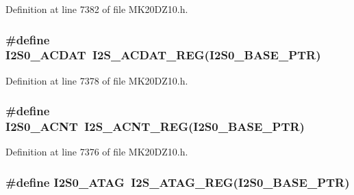 Definition at line 7382 of file M\+K20\+D\+Z10.\+h.

\subsubsection[{\texorpdfstring{I2\+S0\+\_\+\+A\+C\+D\+AT}{I2S0_ACDAT}}]{\setlength{\rightskip}{0pt plus 5cm}\#define I2\+S0\+\_\+\+A\+C\+D\+AT~{\bf I2\+S\+\_\+\+A\+C\+D\+A\+T\+\_\+\+R\+EG}({\bf I2\+S0\+\_\+\+B\+A\+S\+E\+\_\+\+P\+TR})}\hypertarget{group___i2_s___register___accessor___macros_gad7e6ee592876890d170df9885a3d7be5}{}\label{group___i2_s___register___accessor___macros_gad7e6ee592876890d170df9885a3d7be5}


Definition at line 7378 of file M\+K20\+D\+Z10.\+h.

\subsubsection[{\texorpdfstring{I2\+S0\+\_\+\+A\+C\+NT}{I2S0_ACNT}}]{\setlength{\rightskip}{0pt plus 5cm}\#define I2\+S0\+\_\+\+A\+C\+NT~{\bf I2\+S\+\_\+\+A\+C\+N\+T\+\_\+\+R\+EG}({\bf I2\+S0\+\_\+\+B\+A\+S\+E\+\_\+\+P\+TR})}\hypertarget{group___i2_s___register___accessor___macros_ga23dc1fc0ee94812107e735f64500bef6}{}\label{group___i2_s___register___accessor___macros_ga23dc1fc0ee94812107e735f64500bef6}


Definition at line 7376 of file M\+K20\+D\+Z10.\+h.

\subsubsection[{\texorpdfstring{I2\+S0\+\_\+\+A\+T\+AG}{I2S0_ATAG}}]{\setlength{\rightskip}{0pt plus 5cm}\#define I2\+S0\+\_\+\+A\+T\+AG~{\bf I2\+S\+\_\+\+A\+T\+A\+G\+\_\+\+R\+EG}({\bf I2\+S0\+\_\+\+B\+A\+S\+E\+\_\+\+P\+TR})}\hypertarget{group___i2_s___register___accessor___macros_gab7da90fd3a5b742a6f278eba46029095}{}\label{group___i2_s___register___accessor___macros_gab7da90fd3a5b742a6f278eba46029095}


